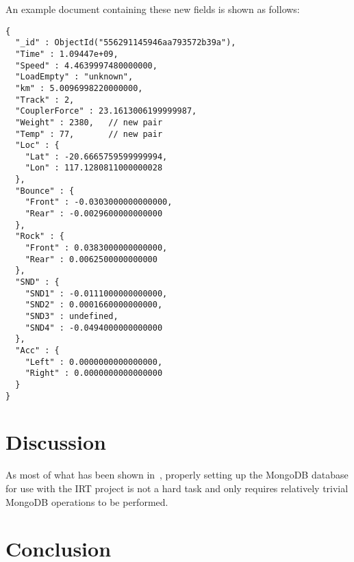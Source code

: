 \documentclass[a4paper,11pt]{article}
\begin{document}
An example document containing these new fields is shown as follows:

\begin{lstlisting}[caption=Example of a document with extra sensor fields that do not exist in original dataset.]
{
  "_id" : ObjectId("556291145946aa793572b39a"),
  "Time" : 1.09447e+09,
  "Speed" : 4.4639997480000000,
  "LoadEmpty" : "unknown",
  "km" : 5.0096998220000000,
  "Track" : 2,
  "CouplerForce" : 23.1613006199999987,
  "Weight" : 2380,   // new pair
  "Temp" : 77,       // new pair
  "Loc" : {
    "Lat" : -20.6665759599999994,
    "Lon" : 117.1280811000000028
  },
  "Bounce" : {
    "Front" : -0.0303000000000000,
    "Rear" : -0.0029600000000000
  },
  "Rock" : {
    "Front" : 0.0383000000000000,
    "Rear" : 0.0062500000000000
  },
  "SND" : {
    "SND1" : -0.0111000000000000,
    "SND2" : 0.0001660000000000,
    "SND3" : undefined,
    "SND4" : -0.0494000000000000
  },
  "Acc" : {
    "Left" : 0.0000000000000000,
    "Right" : 0.0000000000000000
  }
}
\end{lstlisting}




\newpage

\section{Discussion} %
\label{sec:discussion}

As most of what has been shown in~, properly setting up the MongoDB database for use with the IRT
project is not a hard task and only requires relatively trivial MongoDB operations to be performed.



\newpage

\section{Conclusion} %
\label{sec:conclusion}


\newpage                            %



\end{document}
